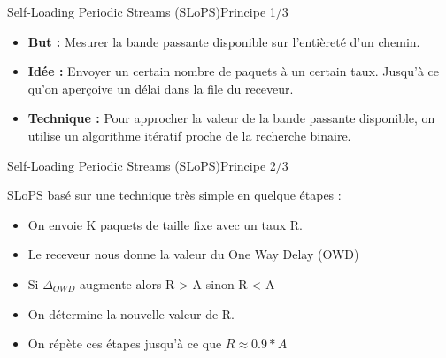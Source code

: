\documentclass[compress]{beamer}
\begin{document}
\begin{frame}{Self-Loading Periodic Streams (SLoPS)}{Principe 1/3}
\begin{itemize}
\item \textbf{But :}  Mesurer la {\color{red}bande passante disponible} sur l'entièreté d'un chemin.
\item \textbf{Idée :}  Envoyer un certain nombre de paquets à un certain 
taux. Jusqu'à ce qu'on aperçoive un délai dans la file du receveur.
\item \textbf{Technique :} Pour approcher la valeur de la bande passante
disponible, on utilise un algorithme itératif proche de la recherche binaire.
\end{itemize}
\end{frame}
\begin{frame}{Self-Loading Periodic Streams (SLoPS)}{Principe 2/3}

SLoPS basé sur une technique très simple en quelque étapes :
\begin{itemize}
\item On envoie K paquets de taille fixe avec un taux R.
\item Le receveur nous donne la valeur du One Way Delay (OWD)
\item Si $\Delta_{OWD}$ augmente alors R > A sinon R < A
\item On détermine la nouvelle valeur de R.
\item On répète ces étapes jusqu'à ce que $R \approx 0.9 * A$
\end{itemize}
\end{frame}
\end{document}
